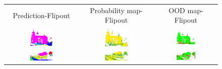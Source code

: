         \begin{figure}[h!]
            \centering
            \begin{tabular}{ccc}
                Prediction-Flipout & Probability map-Flipout & OOD map-Flipout \\
                \includegraphics[width=0.33\textwidth, height=0.18\textheight]{images/ood_imgs/fout_sem3d/fout_1.png} &
                \includegraphics[width=0.33\textwidth, height=0.18\textheight]{images/ood_imgs/fout_sem3d/fout_prob_1.png}& 
                \includegraphics[width=0.33\textwidth, height=0.18\textheight]{images/ood_imgs/fout_sem3d/fout_ood_auroc_1.png}\\

                \includegraphics[width=0.33\textwidth, height=0.18\textheight]{images/ood_imgs/fout_sem3d/fout_2.png} &
                \includegraphics[width=0.33\textwidth, height=0.18\textheight]{images/ood_imgs/fout_sem3d/fout_prob_2.png}& 
                \includegraphics[width=0.33\textwidth, height=0.18\textheight]{images/ood_imgs/fout_sem3d/fout_ood_auroc_2.png}\\
    

\end{tabular}
\end{figure}

